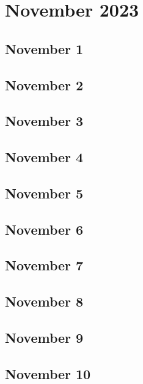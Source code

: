 %
%
%

\chapter{November 2023}
\label{intro} %

\section{November 1}

\section{November 2}

\section{November 3}

\section{November 4}

\section{November 5}

\section{November 6}

\section{November 7}

\section{November 8}

\section{November 9}

\section{November 10}

